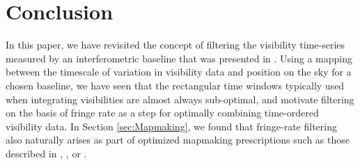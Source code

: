 \documentclass[twocolumn,apj,numberedappendix]{emulateapj}
\newcommand{\vis}{\mathbf{v}}
\newcommand{\A}{\mathbf{A}}
\newcommand{\N}{\mathbf{N}}
\begin{document}
%

\section{Conclusion}
\label{sec:conclusion}

In this paper, we have revisited the concept of filtering the visibility time-series
measured by an interferometric baseline that was presented in \citet{parsons_backer2009}.
Using a mapping between the timescale of variation in visibility data and position
on the sky for a chosen baseline, we have seen that the rectangular time windows typically
used when integrating visibilities are almost always sub-optimal, and motivate 
filtering on the basis of fringe rate
as a step for optimally combining time-ordered visibility data.  In Section \ref{sec:Mapmaking}, we found
that fringe-rate filtering also naturally arises as part of optimized mapmaking prescriptions such as those
described in \citet{T97mapmaking}, \citet{morales_matejek2009}, or \citet{dillon_et_al2015}.
\end{document}
